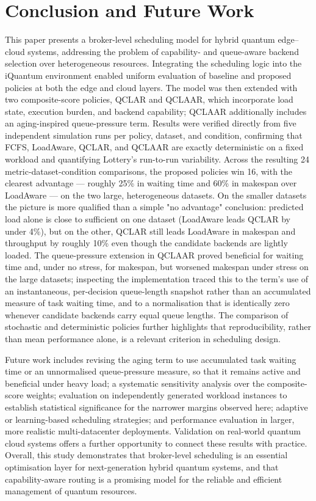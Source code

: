 \documentclass[preprint,12pt]{elsarticle}
\newcommand{\QCLAR}{\textsc{QCLAR}}
\newcommand{\QCLAAR}{\textsc{QCLAAR}}
\begin{document}
\section{Conclusion and Future Work}
\label{sec:conclusion}
This paper presents a broker-level scheduling model for hybrid quantum
edge--cloud systems, addressing the problem of capability- and queue-aware
backend selection over heterogeneous resources. Integrating the scheduling logic
into the iQuantum environment enabled uniform evaluation of baseline and
proposed policies at both the edge and cloud layers. The model was then extended
with two composite-score policies, \QCLAR{} and \QCLAAR{}, which incorporate
load state, execution burden, and backend capability; \QCLAAR{} additionally
includes an aging-inspired queue-pressure term. Results were verified directly
from five independent simulation runs per policy, dataset, and condition,
confirming that FCFS, LoadAware, QCLAR, and QCLAAR are exactly deterministic on
a fixed workload and quantifying Lottery's run-to-run variability. Across the
resulting 24 metric-dataset-condition comparisons, the proposed policies win
16, with the clearest advantage --- roughly 25\% in waiting time and 60\% in
makespan over LoadAware --- on the two large, heterogeneous datasets. On the
smaller datasets the picture is more qualified than a simple "no advantage"
conclusion: predicted load alone is close to sufficient on one dataset (LoadAware
leads QCLAR by under 4\%), but on the other, QCLAR still leads LoadAware in
makespan and throughput by roughly 10\% even though the candidate backends are
lightly loaded. The queue-pressure extension in QCLAAR proved beneficial for
waiting time and, under no stress, for makespan, but worsened makespan under
stress on the large datasets; inspecting the implementation traced this to the
term's use of an instantaneous, per-decision queue-length snapshot rather than
an accumulated measure of task waiting time, and to a normalisation that is
identically zero whenever candidate backends carry equal queue lengths. The
comparison of stochastic and deterministic policies further highlights that
reproducibility, rather than mean performance alone, is a relevant criterion in
scheduling design.

Future work includes revising the aging term to use accumulated task waiting
time or an unnormalised queue-pressure measure, so that it remains active and
beneficial under heavy load; a systematic sensitivity analysis over the
composite-score weights; evaluation on independently generated workload
instances to establish statistical significance for the narrower margins
observed here; adaptive or learning-based scheduling strategies; and performance
evaluation in larger, more realistic multi-datacenter deployments. Validation on
real-world quantum cloud systems offers a further opportunity to connect these
results with practice. Overall, this study demonstrates that broker-level
scheduling is an essential optimisation layer for next-generation hybrid quantum
systems, and that capability-aware routing is a promising model for the
reliable and efficient
management of quantum resources.
\end{document}
